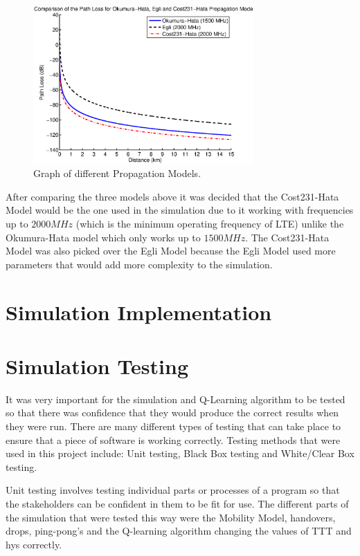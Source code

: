 \begin{figure}[H]
  \begin{center}
    	  \includegraphics[width=0.75\textwidth]{figures/simulation/prop.eps}
    \end{center}
    \caption{Graph of different Propagation Models.}
    \label{fig:prop}
\end{figure}
After comparing the three models above it was decided that the Cost231-Hata Model would be the one used in the simulation due to it working with frequencies up to $2000 MHz$ (which is the minimum operating frequency of LTE) unlike the Okumura-Hata model which only works up to $1500 MHz$. The Cost231-Hata Model was also picked over the Egli Model because the Egli Model used more parameters that would add more complexity to the simulation.~\cite{chebil2011comparison, shabbir2011comparison}

\section{Simulation Implementation}


\section{Simulation Testing}
It was very important for the simulation and Q-Learning algorithm to be tested so that there was confidence that they would produce the correct results when they were run. There are many different types of testing that can take place to ensure that a piece of software is working correctly. Testing methods that were used in this project include: Unit testing, Black Box testing and White/Clear Box testing.

Unit testing involves testing individual parts or processes of a program so that the stakeholders can be confident in them to be fit for use. The different parts of the simulation that were tested this way were the Mobility Model, handovers, drops, ping-pong's and the Q-learning algorithm changing the values of TTT and hys correctly.

